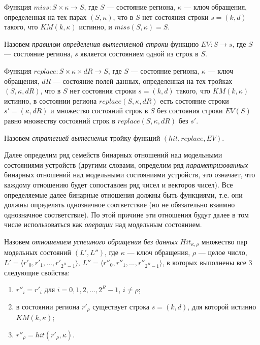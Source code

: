 Функция $miss: S \times \kappa \rightarrow S$, где $S$ --- состояние региона, $\kappa$ --- ключ обращения, определенная на тех парах $(S, \kappa)$, что в $S$ нет состояния строки $s = (k,d)$ такого, что $KM(k, \kappa)$ истинно, и $miss(S, \kappa) = S$.

Назовем \emph{правилом определения вытесняемой строки} функцию $EV : S \rightarrow s$, где $S$ --- состояние региона, $s$ является состоянием одной из строк в $S$.

Функция $replace: S \times \kappa \times dR \rightarrow S$, где $S$ --- состояние региона, $\kappa$ --- ключ обращения, $dR$ --- состояние полей данных, определенная на тех тройках $(S, \kappa, dR)$, что в $S$ нет состояния строки $s = (k,d)$ такого, что $KM(k, \kappa)$ истинно, в состоянии региона $replace(S, \kappa, dR)$ есть состояние строки $s' = (\kappa, dR)$ и множество состояний строк в $S$ без состояния строки $EV(S)$ равно множеству состояний строк в $replace(S, \kappa, dR)$ без $s'$.

Назовем \emph{стратегией вытеснения} тройку функций $(hit, replace, EV)$.

Далее определим ряд семейств бинарных отношений над модельными состояниями устройств (другими словами, определим ряд \emph{параметризованных} бинарных отношений над модельными состояниями устройств, это означает, что каждому отношению будет сопоставлен ряд чисел и векторов чисел). Все определяемые далее бинарные отношения должны быть функциями, т.е. они должны определять однозначное соответствие (но не обязательно взаимно однозначное соответствие). По этой причине эти отношения будут далее в том числе использоваться как \emph{операции} над модельным состоянием.

Назовем \emph{отношением успешного обращения без данных} $Hit_{\kappa, \rho}$ множество пар модельных состояний $(L', L'')$, где $\kappa$ --- ключ обращения, $\rho$ --- целое число, $L' = \langle r'_0, r'_1, ..., r'_{2^R-1} \rangle$, $L'' = \langle r''_0, r''_1, ..., r''_{2^R-1} \rangle$, в которых выполнены все 3 следующие свойства:
  \begin{enumerate}
    \item $r''_i = r'_i$ для $i = 0, 1, 2, ..., 2^R{-}1$, $i \neq \rho$;
    \item в состоянии региона $r'_{\rho}$ существует строка $s = (k,d)$, для которой истинно $KM(k, \kappa)$;
    \item $r''_{\rho} = hit(r'_{\rho}, \kappa)$.
  \end{enumerate}

